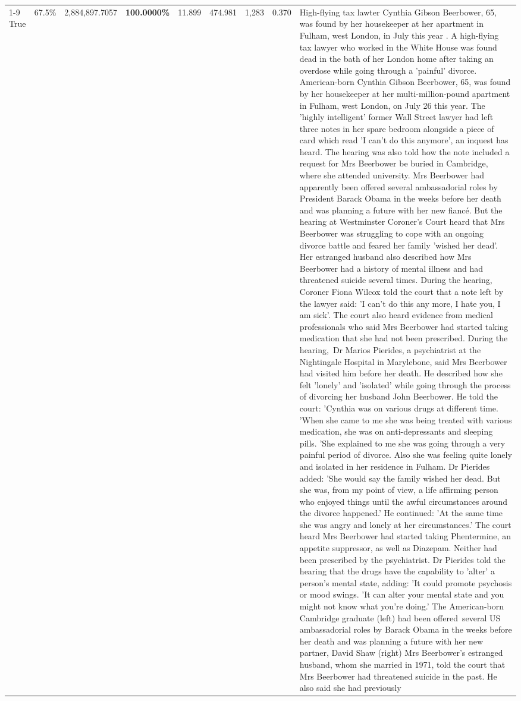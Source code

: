 \begin{table}[H]
\begin{tabular}{lllrlllll}
\cline{1-9}
True & 67.5\% & 2,884,897.7057 & \bfseries \color{red} 100.0000\% & 11.899 & 474.981 & 1,283 & 0.370 & High-flying tax lawter Cynthia Gibson Beerbower, 65, was found by her housekeeper at her apartment in Fulham, west London, in July this year . A high-flying tax lawyer who worked in the White House was found dead in the bath of her London home after taking an overdose while going through a 'painful' divorce. American-born Cynthia Gibson Beerbower, 65, was found by her housekeeper at her multi-million-pound apartment in Fulham, west London, on July 26 this year. The 'highly intelligent' former Wall Street lawyer had left three notes in her spare bedroom alongside a piece of card which read 'I can't do this anymore', an inquest has heard. The hearing was also told how the note included a request for Mrs Beerbower be buried in Cambridge, where she attended university. Mrs Beerbower had apparently been offered several ambassadorial roles by President Barack Obama in the weeks before her death and was planning a future with her new fiancé. But the hearing at Westminster Coroner's Court heard that Mrs Beerbower was struggling to cope with an ongoing divorce battle and feared her family 'wished her dead'. Her estranged husband also described how Mrs Beerbower had a history of mental illness and had threatened suicide several times. During the hearing, Coroner Fiona Wilcox told the court that a note left by the lawyer said: 'I can't do this any more, I hate you, I am sick'. The court also heard evidence from medical professionals who said Mrs Beerbower had started taking medication that she had not been prescribed. During the hearing, Dr Marios Pierides, a psychiatrist at the Nightingale Hospital in Marylebone, said Mrs Beerbower had visited him before her death. He described how she felt 'lonely' and 'isolated' while going through the process of divorcing her husband John Beerbower. He told the court: 'Cynthia was on various drugs at different time. 'When she came to me she was being treated with various medication, she was on anti-depressants and sleeping pills. 'She explained to me she was going through a very painful period of divorce. Also she was feeling quite lonely and isolated in her residence in Fulham. Dr Pierides added: 'She would say the family wished her dead. But she was, from my point of view, a life affirming person who enjoyed things until the awful circumstances around the divorce happened.' He continued: 'At the same time she was angry and lonely at her circumstances.' The court heard Mrs Beerbower had started taking Phentermine, an appetite suppressor, as well as Diazepam. Neither had been prescribed by the psychiatrist. Dr Pierides told the hearing that the drugs have the capability to 'alter' a person's mental state, adding: 'It could promote psychosis or mood swings. 'It can alter your mental state and you might not know what you're doing.' The American-born Cambridge graduate (left) had been offered several US ambassadorial roles by Barack Obama in the weeks before her death and was planning a future with her new partner, David Shaw (right) Mrs Beerbower's estranged husband, whom she married in 1971, told the court that Mrs Beerbower had threatened suicide in the past. He also said she had previously 
\end{tabular}
\end{table}
